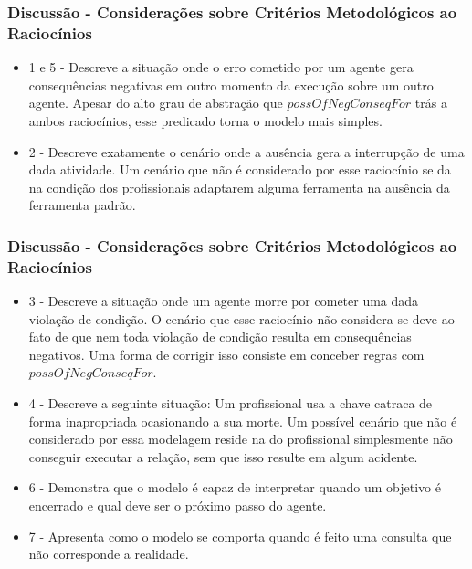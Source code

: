 \documentclass{beamer}
\begin{document}
\begin{frame}
	\frametitle{Discussão - Considerações sobre Critérios Metodológicos ao Raciocínios}
	\begin{itemize}
		\item 1 e 5 - Descreve a situação onde o erro cometido por um agente gera consequências negativas em outro momento da execução sobre um outro agente. Apesar do alto grau de abstração que $possOfNegConseqFor$ trás a ambos raciocínios, esse predicado torna o modelo mais simples. 
		\item 2 - Descreve exatamente o cenário onde a ausência gera a interrupção de uma dada atividade. Um cenário que não é considerado por esse raciocínio se da na condição dos profissionais adaptarem alguma ferramenta na ausência da ferramenta padrão.
	\end{itemize}
\end{frame}

\begin{frame}
	\frametitle{Discussão - Considerações sobre Critérios Metodológicos ao Raciocínios}
	\begin{itemize}
		\item 3 - Descreve a situação onde um agente morre por cometer uma dada violação de condição. O cenário que esse raciocínio não considera se deve ao fato de que nem toda violação de condição resulta em consequências negativos. Uma forma de corrigir isso consiste em conceber regras com $possOfNegConseqFor$.
		\item 4 - Descreve a seguinte situação: Um profissional usa a chave catraca de forma inapropriada ocasionando a sua morte. Um possível cenário que não é considerado por essa modelagem reside na do profissional simplesmente não conseguir executar a relação, sem que isso resulte em algum acidente.
		\item 6 - Demonstra que o modelo é capaz de interpretar quando um objetivo é encerrado e qual deve ser o próximo passo do agente. 
		\item 7 - Apresenta como o modelo se comporta quando é feito uma consulta que não corresponde a realidade. 
	\end{itemize}
\end{frame}
\end{document}
